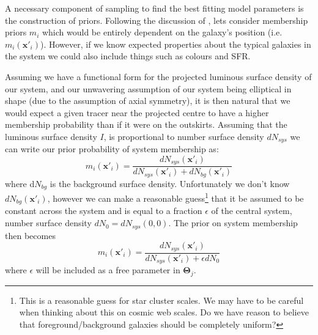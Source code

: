 A necessary component of sampling to find the best fitting model parameters is the construction of priors. Following the discussion of \citet{watkins2013}, lets consider membership priors $m_i$ which would be entirely dependent on the galaxy's position (i.e. $m_{i}(\boldsymbol{x}'_{i})$). However, if we know expected properties about the typical galaxies in the system we could also include things such as colours and SFR. 

Assuming we have a functional form for the projected luminous surface density of our system, and our unwavering assumption of our system being elliptical in shape (due to the assumption of axial symmetry), it is then natural that we would expect a given tracer near the projected centre to have a higher membership probability than if it were on the outskirts. Assuming that the luminous surface density $I$, is proportional to number surface density $dN_{sys}$ we can write our prior probability of system membership as:
\begin{equation}
m_{i}(\boldsymbol{x}'_{i}) = \frac{dN_{sys}(\boldsymbol{x}'_{i})}{dN_{sys}(\boldsymbol{x}'_{i}) + dN_{bg}(\boldsymbol{x}'_{i})}
\end{equation}
where d$N_{bg}$ is the background surface density. Unfortunately we don't know $dN_{bg}(\boldsymbol{x}'_{i})$, however we can make a reasonable guess\footnote{This is a reasonable guess for star cluster scales. We may have to be careful when thinking about this on cosmic web scales. Do we have reason to believe that foreground/background galaxies should be completely uniform?} that it be assumed to be constant across the system and is equal to a fraction $\epsilon$ of the central system, number surface density $dN_{0} = dN_{sys}(0,0)$. The prior on system membership then becomes
\begin{equation}
m_{i}(\boldsymbol{x}'_{i}) = \frac{dN_{sys}(\boldsymbol{x}'_{i})}{dN_{sys}(\boldsymbol{x}'_{i}) + \epsilon dN_{0}}
\end{equation}
where $\epsilon$ will be included as a free parameter in $\boldsymbol{\Theta}_{j}$.

